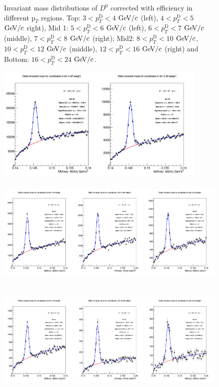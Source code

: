 \begin{figure}[!htp]
\caption{Invariant mass distributions of $D^0$ corrected with efficiency in different $\text{p}_T$ regions. Top: $3< p_{T}^{\text{D}}< 4$ $\mathrm{GeV}/c$ (left), $4< p_{T}^{\text{D}}< 5$ $\mathrm{GeV}/c$ right), Mid 1: $5< p_{T}^{\text{D}}< 6$ $\mathrm{GeV}/c$ (left), $6 < p_{T}^{\text{D}} < 7$ $\mathrm{GeV}/c$ (middle), $7< p_{T}^{\text{D}}< 8$ $\mathrm{GeV}/c$ (right); Mid2: $8< p_{T}^{\text{D}}< 10$ $\mathrm{GeV}/c$, $10< p_{T}^{\text{D}}< 12$ $\mathrm{GeV}/c$  (middle), $12 < p_{T}^{\text{D}}< 16$ $\mathrm{GeV}/c$  (right) and Bottom: $16<p_{T}^{\text{D}}< 24$ $\mathrm{GeV}/c$.}
\label{fig:InvMassD0}
\end{figure}

\begin{figure}[!htp]
\centering
{\includegraphics[width=1\linewidth, height=5.6cm]{figures/Dstar_wEFF/InvMassDistributions_Dstar_Bins2to3.png}}
{\includegraphics[width=1\linewidth, height=5.6cm]{figures/Dstar_wEFF/InvMassDistributions_Dstar_Bins4to6.png}}
{\includegraphics[width=1\linewidth, height=5.6cm]{figures/Dstar_wEFF/InvMassDistributions_Dstar_Bins7to9.png}}

\end{figure}
